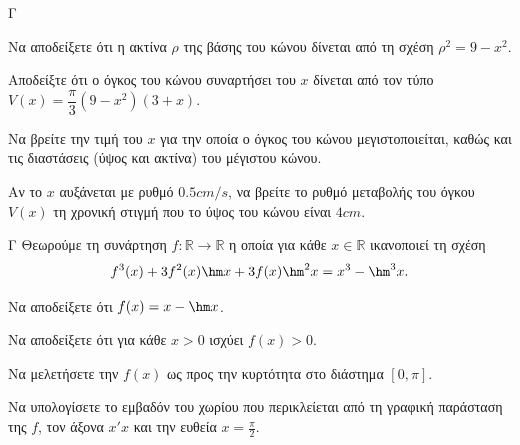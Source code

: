 \begin{thema}{Γ}
\begin{center}
\end{center}
\begin{erwthma}
  \item Να αποδείξετε ότι η ακτίνα $\rho$ της βάσης του κώνου δίνεται από τη σχέση $\rho^2 = 9 - x^2$.
  \item Αποδείξτε ότι ο όγκος του κώνου συναρτήσει του $x$ δίνεται από τον τύπο $V(x) = \dfrac{\pi}{3}(9-x^2)(3+x)$.
  \item Να βρείτε την τιμή του $x$ για την οποία ο όγκος του κώνου μεγιστοποιείται, καθώς και τις διαστάσεις (ύψος και ακτίνα) του μέγιστου κώνου.
  \item Αν το $x$ αυξάνεται με ρυθμό $0.5 \si{cm/s}$, να βρείτε το ρυθμό μεταβολής του όγκου $V(x)$ τη χρονική στιγμή που το ύψος του κώνου είναι $4\si{cm}$.
\end{erwthma}
\end{thema}

\begin{thema}{Γ}
Θεωρούμε τη συνάρτηση $f: \mathbb{R} \to \mathbb{R}$ η οποία για κάθε $x \in \mathbb{R}$ ικανοποιεί τη σχέση \[f^3(x) + 3f^2(x)\hm x + 3f(x)\hm^2 x = x^3 - \hm^3 x.\]
\begin{erwthma}
  \item Να αποδείξετε ότι $f(x) = x - \hm x$.
  \item Να αποδείξετε ότι για κάθε $x > 0$ ισχύει $f(x) > 0$.
  \item Να μελετήσετε την $f(x)$ ως προς την κυρτότητα στο διάστημα $[0, \pi]$.
  \item Να υπολογίσετε το εμβαδόν του χωρίου που περικλείεται από τη γραφική παράσταση της $f$, τον άξονα $x'x$ και την ευθεία $x = \frac{\pi}{2}$.
\end{erwthma}
\end{thema}

